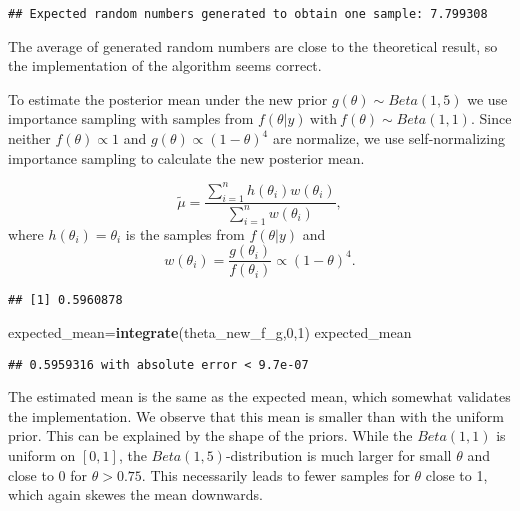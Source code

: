 \documentclass[]{article}
\newenvironment{Shaded}{\begin{snugshade}}{\end{snugshade}}
\newcommand{\CommentTok}[1]{\textcolor[rgb]{0.56,0.35,0.01}{\textit{#1}}}
\newcommand{\ControlFlowTok}[1]{\textcolor[rgb]{0.13,0.29,0.53}{\textbf{#1}}}
\newcommand{\DecValTok}[1]{\textcolor[rgb]{0.00,0.00,0.81}{#1}}
\newcommand{\KeywordTok}[1]{\textcolor[rgb]{0.13,0.29,0.53}{\textbf{#1}}}
\newcommand{\NormalTok}[1]{#1}
\newcommand{\OperatorTok}[1]{\textcolor[rgb]{0.81,0.36,0.00}{\textbf{#1}}}
\newcommand{\StringTok}[1]{\textcolor[rgb]{0.31,0.60,0.02}{#1}}
\begin{document}
\begin{verbatim}
## Expected random numbers generated to obtain one sample: 7.799308
\end{verbatim}

The average of generated random numbers are close to the theoretical
result, so the implementation of the algorithm seems correct.

To estimate the posterior mean under the new prior
\(g(\theta) \sim Beta(1,5)\) we use importance sampling with samples
from \(f(\theta|y) ~\text{with}~ f(\theta) \sim Beta(1,1)\). Since
neither \(f(\theta) \propto 1\) and \(g(\theta) \propto (1-\theta)^4\)
are normalize, we use self-normalizing importance sampling to calculate
the new posterior mean.

\[
\tilde{\mu}=\frac{\sum_{i=1}^{n}h(\theta_i)w(\theta_i)}{\sum_{i=1}^{n}w(\theta_i)},
\] where \(h(\theta_i)=\theta_i\) is the samples from \(f(\theta|y)\)
and \[
w(\theta_i)=\frac{g(\theta_i)}{f(\theta_i)} \propto (1-\theta)^4.
\]

\begin{Shaded}
\end{Shaded}

\begin{verbatim}
## [1] 0.5960878
\end{verbatim}

\begin{Shaded}
\begin{Highlighting}[]
\NormalTok{expected_mean=}\KeywordTok{integrate}\NormalTok{(theta_new_f_g,}\DecValTok{0}\NormalTok{,}\DecValTok{1}\NormalTok{) }
\NormalTok{expected_mean}
\end{Highlighting}
\end{Shaded}

\begin{verbatim}
## 0.5959316 with absolute error < 9.7e-07
\end{verbatim}

The estimated mean is the same as the expected mean, which somewhat
validates the implementation. We observe that this mean is smaller than
with the uniform prior. This can be explained by the shape of the
priors. While the \(Beta(1,1)\) is uniform on \([0,1]\), the
\(Beta(1,5)\)-distribution is much larger for small \(\theta\) and close
to 0 for \(\theta>0.75\). This necessarily leads to fewer samples for
\(\theta\) close to 1, which again skewes the mean downwards.
\end{document}
